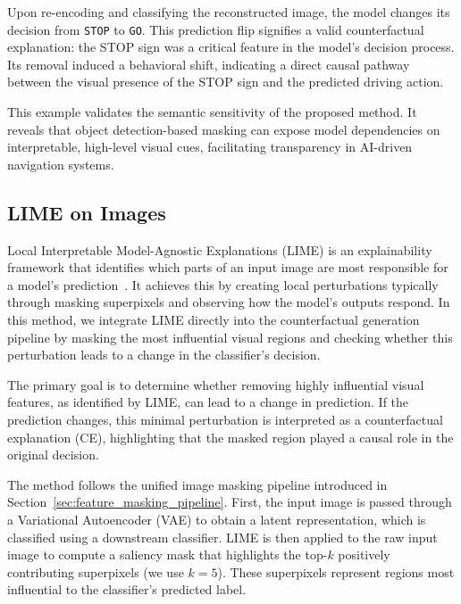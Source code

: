 Upon re-encoding and classifying the reconstructed image, the model changes its decision from \texttt{STOP} to \texttt{GO}. This prediction flip signifies a valid counterfactual explanation: the STOP sign was a critical feature in the model’s decision process. Its removal induced a behavioral shift, indicating a direct causal pathway between the visual presence of the STOP sign and the predicted driving action.

This example validates the semantic sensitivity of the proposed method. It reveals that object detection-based masking can expose model dependencies on interpretable, high-level visual cues, facilitating transparency in AI-driven navigation systems.





\subsection{LIME on Images} \label{sec:lime_on_images}

Local Interpretable Model-Agnostic Explanations (LIME) is an explainability framework that identifies which parts of an input image are most responsible for a model’s prediction~\cite{Ribeiro2018}. It achieves this by creating local perturbations typically through masking superpixels and observing how the model’s outputs respond. In this method, we integrate LIME directly into the counterfactual generation pipeline by masking the most influential visual regions and checking whether this perturbation leads to a change in the classifier’s decision.

The primary goal is to determine whether removing highly influential visual features, as identified by LIME, can lead to a change in prediction. If the prediction changes, this minimal perturbation is interpreted as a counterfactual explanation (CE), highlighting that the masked region played a causal role in the original decision.

The method follows the unified image masking pipeline introduced in Section~\ref{sec:feature_masking_pipeline}. First, the input image is passed through a Variational Autoencoder (VAE) to obtain a latent representation, which is classified using a downstream classifier. LIME is then applied to the raw input image to compute a saliency mask that highlights the top-$k$ positively contributing superpixels (we use $k=5$). These superpixels represent regions most influential to the classifier’s predicted label.

